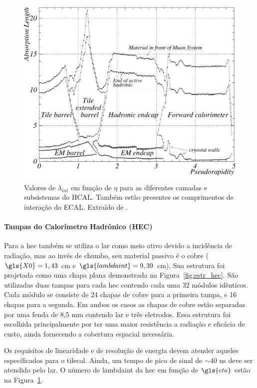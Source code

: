 \begin{figure}[h!t]
\centering
\includegraphics[width=.6\textwidth]{imagens/cal_had_lambda.pdf}
\caption[Valores de $\lambda_{int}$ em função de $\eta$ para as diferentes
camadas e subsistemas do calorímetro]{
Valores de $\lambda_{int}$ em função de $\eta$ para as diferentes
camadas e subsistemas do HCAL. Também estão presentes os comprimentos de interação do ECAL. 
Extraído de \cite{cal_tdr}.}
\label{fig:cal_had_lambda}
\end{figure}


\paragraph{Tampas do Calorímetro Hadrônico (HEC)}
\label{par:cal_hec}

Para a \gls{hec} também se utiliza o \gls{lar} como meio ativo devido a
incidência de radiação, mas ao invés de chumbo, seu material passivo é o cobre
($\gls{X0} = 1,43$ cm e $\gls{lambdaint}=9,39$ cm). 
Sua estrutura foi projetada como uma chapa plana 
demonstrada na Figura~\ref{fig:estr_hec}. São utilizadas duas tampas para cada
\gls{hec} contendo cada uma 32 módulos idênticos. Cada módulo se consiste de 24
chapas de cobre para a primeira tampa, e 16 chapas para a segunda. Em ambos os
casos as chapas de cobre estão separadas por uma fenda de 8,5 mm contendo
\gls{lar} e três eletrodos. Essa estrutura foi escolhida principalmente por ter
uma maior resistência a radiação e eficácia de custo, ainda fornecendo a
cobertura espacial necessária.

Os requisitos de linearidade e de resolução de energia devem atender aqueles
especificados para o \gls{tilecal}. Ainda, um tempo de pico de sinal
de $\sim40$ ns deve ser atendido pelo \gls{lar}. O número de \gls{lambdaint} da
\gls{hec} em função de $\gls{eta}$ estão na Figura~\ref{fig:cal_had_lambda}.


